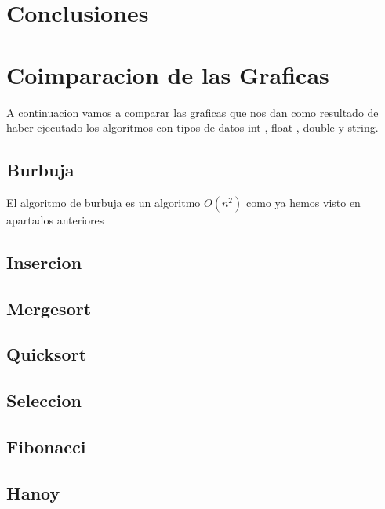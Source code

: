 \documentclass[11pt]{article}
\begin{document}
\section{Conclusiones}
\section{Coimparacion de las Graficas}
    A continuacion vamos a comparar las graficas que nos dan como resultado de haber ejecutado los algoritmos con tipos de datos int , float , double y string. 
\subsection{Burbuja}
El algoritmo de burbuja es un algoritmo \(O(n^2)\) como ya hemos visto en apartados anteriores 

\subsection{Insercion}
\subsection{Mergesort}
\subsection{Quicksort}
\subsection{Seleccion}
\subsection{Fibonacci}
\subsection{Hanoy}
\end{document}
